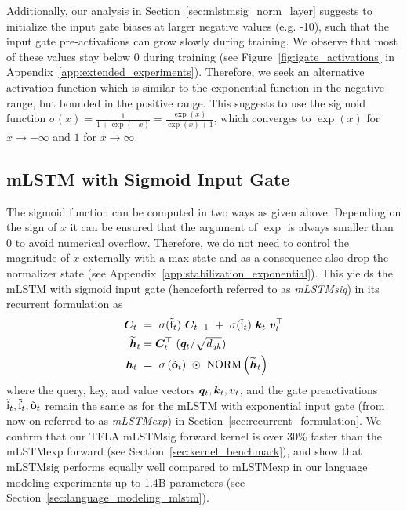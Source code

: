 \documentclass{article}
\begin{document}
Additionally, our analysis in Section~\ref{sec:mlstmsig_norm_layer} suggests to initialize the input gate biases at larger negative values (e.g. -10), such that the input gate pre-activations can grow slowly during training.
We observe that most of these values stay below 0 during training (see Figure~\ref{fig:igate_activations} in Appendix~\ref{app:extended_experiments}).
Therefore, we seek an alternative activation function which is similar to the exponential function in the negative range, but bounded in the positive range.
This suggests to use the sigmoid function
$\sigma(x)=\frac{1}{1+\exp(-x)}=\frac{\exp(x)}{\exp(x)+1}$,
which converges to $\exp(x)$ for $x \rightarrow -\infty$ and $1$ for $x \rightarrow \infty$.
\vspace{-0.1cm}
\subsection{mLSTM with Sigmoid Input Gate}
\label{sec:mlstmsig_sigmoid_ingate}
\vspace{-0.2cm}
The sigmoid function can be computed in two ways as given above.%
Depending on the sign of $x$ it can be ensured that the argument of $\exp$ is always smaller than $0$ to avoid numerical overflow.
Therefore, we do not need to control the magnitude of $x$ externally with a max state and as a consequence also drop the normalizer state (see Appendix~\ref{app:stabilization_exponential}).
This yields the mLSTM with sigmoid input gate (henceforth referred to as \emph{mLSTMsig}) in its recurrent formulation as
\begin{align}
    \BC_t \           & = \   \sigma(\tilde{\Rf}_t) \ \BC_{t-1} \ + \ \sigma(\tilde{\Ri}_t) \ {\Bk_t \ \Bv_t^\top}         \\
    \widetilde{\Bh}_t & =   \BC_t^\top \ ({\Bq_t} / \sqrt{d_{qk}})                                                         \\
    \Bh_t  \          & = \ \sigma \left( \tilde{\bfo}_t \right) \ \odot  \ \mathrm{NORM} \left( \widetilde{\Bh}_t \right)
\end{align}
where the query, key, and value vectors $\bm{q}_t,\bm{k}_t,\bm{v}_t$, and the gate preactivations $\tilde{\mathrm{i}}_t, \tilde{\mathrm{f}}_t, \tilde{\mathbf{o}}_t$ remain the same as for the mLSTM with exponential input gate (from now on referred to as \emph{mLSTMexp}) in Section~\ref{sec:recurrent_formulation}.
We confirm that our TFLA mLSTMsig forward kernel is over 30\% faster than the mLSTMexp forward (see Section~\ref{sec:kernel_benchmark}), 
and show that mLSTMsig performs equally well compared to mLSTMexp in our language modeling experiments up to 1.4B parameters (see Section~\ref{sec:language_modeling_mlstm}).
\vspace{-0.2cm}
\end{document}
